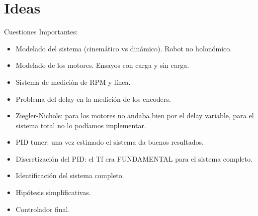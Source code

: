 \documentclass[10pt,conference,a4paper,onecolumn]{article}%
\begin{document}










\section{Ideas}
Cuestiones Importantes:
\begin{itemize}



\item	Modelado del sistema (cinemático vs dinámico). Robot no holonómico.
\item	Modelado de los motores. Ensayos con carga y sin carga.
\item	Sistema de medición de RPM y línea.
\item	Problema del delay en la medición de los encoders.
\item	Ziegler-Nichols: para los motores no andaba bien por el delay variable, para el sistema total no lo podíamos implementar.
\item	PID tuner: una vez estimado el sistema da buenos resultados.
\item	Discretización del PID: el Tf era FUNDAMENTAL para el sistema completo.
\item	Identificación del sistema completo.
\item	Hipótesis simplificativas.
\item	Controlador final.
\end{itemize}
\end{document}
